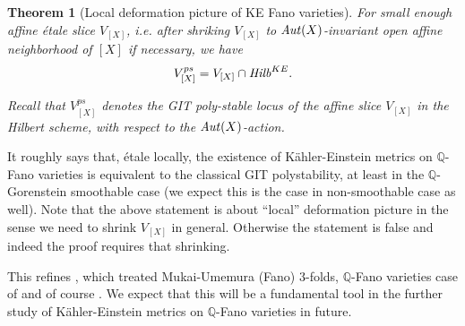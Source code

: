 \documentclass[12pt]{amsart}
\newtheorem{Thm}{Theorem}[section]
\theoremstyle{remark}
\theoremstyle{definition}
\begin{document}
\begin{Thm}[Local deformation picture of KE Fano varieties]\label{local.GIT}
For small enough affine \'etale slice $V_{[X]}$, i.e. after shriking $V_{[X]}$ to 
${\it Aut}(X)$-invariant open affine neighborhood of $[X]$ if necessary, we have 
$$V_{[X]}^{ps}=V_{[X]}\cap {\it Hilb}^{KE}.$$ 

Recall that $V_{[X]}^{ps}$ denotes the GIT poly-stable locus of the affine slice 
$V_{[X]}$ in the Hilbert scheme, with 
respect to the ${\it Aut}(X)$-action. 
\end{Thm}

It roughly says that, \'etale locally, the existence of K\"ahler-Einstein metrics on 
$\mathbb{Q}$-Fano varieties is equivalent to the classical GIT polystability, 
at least in the $\mathbb{Q}$-Gorenstein smoothable case (we expect this is the case 
in non-smoothable case as well). Note that the above statement is about ``local'' 
deformation picture in the sense we need to shrink $V_{[X]}$ in general. Otherwise 
the statement is false and indeed the proof requires that shrinking. 

This refines \cite[section 7]{Tia}, \cite[subsection 5.3]{Don1} which 
treated Mukai-Umemura (Fano) $3$-folds, $\mathbb{Q}$-Fano varieties case of 
\cite{Sze} 
and of course \cite[Lemma 3.6]{OSS}. We expect that this will be a 
fundamental tool in the further 
study of K\"ahler-Einstein metrics on $\mathbb{Q}$-Fano 
varieties in future. 
\end{document}
